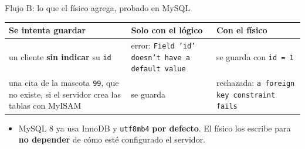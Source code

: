 \documentclass[aspectratio=169,10pt,c]{beamer}
\newcommand{\mal}[1]{{\setlength{\fboxsep}{1.2pt}\colorbox{utpRojo!18}{#1}}}
\begin{document}
\begin{frame}{Flujo B: lo que el físico agrega, probado en MySQL}
\begin{center}
\small
\renewcommand{\arraystretch}{1.3}
\begin{tabular}{@{}>{\raggedright}p{3.9cm}>{\raggedright}p{4.2cm}>{\raggedright\arraybackslash}p{4.3cm}@{}}
\toprule
\bfseries Se intenta guardar & \bfseries Solo con el lógico & \bfseries Con el físico \\
\midrule
un cliente \textbf{sin indicar} su \texttt{id} & \mal{error:} \texttt{Field 'id' doesn't have a default value} & se guarda con \texttt{id = 1} \\
una cita de la mascota \texttt{99}, que no existe, si el servidor crea las tablas con MyISAM & \mal{se guarda} & rechazada: \texttt{a foreign key constraint fails} \\
\bottomrule
\end{tabular}
\end{center}
\vspace{0.15cm}
\begin{itemize}\setlength\itemsep{3pt}
  \item MySQL 8 ya usa InnoDB y \texttt{utf8mb4} \textbf{por defecto}. El físico los escribe para \textbf{no depender} de cómo esté configurado el servidor.
\end{itemize}
\end{frame}
\end{document}
